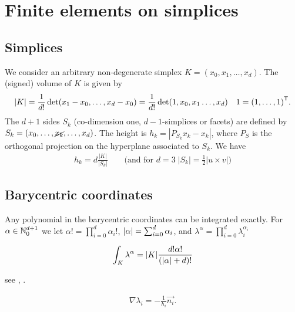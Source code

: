%
\section{Finite elements on simplices}\label{sec:}
%
%
\subsection{Simplices}\label{subsec:}
%
We consider an arbitrary non-degenerate simplex $K=(x_0,x_1,\ldots, x_{d})$. The (signed) volume of $K$ is given by
%
\begin{equation}\label{eq:}
|K| = \frac{1}{d!} \det(x_1-x_{0},\ldots, x_{d}-x_{0})= \frac{1}{d!} \det(1,x_{0},x_1\ldots, x_{d})\quad 1={(1,\ldots,1)}^{\mathsf{T}}.
\end{equation}
%
The $d+1$ sides $S_k$ (co-dimension one, $d-1$-simplices or facets) are defined by
$S_k=(x_0,\ldots, \cancel{x_k}, \ldots, x_{d})$. The height is $h_k=|P_{S_k}x_k - x_k|$, where $P_S$ is the orthogonal projection on the hyperplane associated to $S_k$. We have
%
\begin{align*}
h_k = d\frac{|K|}{|S_k|} \qquad\mbox{(and for $d=3 \; |S_k| = \frac12 |u\times v| $)}
\end{align*}
%
%
\subsection{Barycentric coordinates}\label{subsec:}
%
%
Any polynomial in the barycentric coordinates can be integrated exactly. For $\alpha\in\mathbb N_0^{d+1}$ we 
let $\alpha! = \prod_{i=0}^d \alpha_i!$, $\left|\alpha\right|=\sum_{i=0}^d\alpha_i$, and $\lambda^{\alpha} = \prod_{i=0}^d \lambda_i^{\alpha_i}$
%
\begin{yellow}[Integration on $K$]
\begin{equation}\label{eq:}
\int_K \lambda^{\alpha} =|K|\frac{ d!\alpha!}{\left( \left|\alpha\right| + d\right)!}
\end{equation}
\end{yellow}
%
see \cite{EisenbergMalvern73}, \cite{VermolenSegal18}.
%
%
\begin{yellow}
\begin{align*}
\nabla \lambda_i = - \frac{1}{h_i}\vec{n_i}. 
\end{align*}
\end{yellow}
%
%
